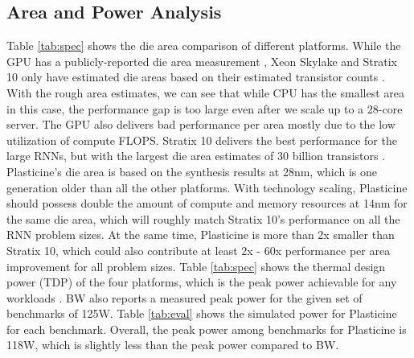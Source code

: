 \subsection{Area and Power Analysis} \label{sec:results}
Table \ref{tab:spec} shows the die area comparison of different platforms.
	While the GPU has a publicly-reported die area measurement \cite{markidis2018nvidia},
	Xeon Skylake and Stratix 10 only have estimated die areas based on
	their estimated transistor counts \cite{inteldie}.
With the rough area estimates, we can see that while CPU has the smallest area in this case,
	the performance gap is too large even after we scale up to a 28-core server.
The GPU also delivers bad performance per area mostly due to the low utilization of compute FLOPS.
Stratix 10 delivers the best performance for the large RNNs,
	but with the largest die area estimates of 30 billion transistors \cite{stratix10die}.
Plasticine's die area is based on the synthesis results at 28nm,
	which is one generation older than all the other platforms.
With technology scaling,
	Plasticine should possess double the amount of compute and memory resources at 14nm for the same die area,
	which will roughly match Stratix 10's performance on all the RNN problem sizes.
At the same time, Plasticine is more than 2x smaller than Stratix 10,
	which could also contribute at least 2x - 60x performance per area improvement for all problem sizes.
Table \ref{tab:spec} shows the thermal design power (TDP) of the four platforms,
	which is the peak power achievable for any workloads \cite{inteltdp, stratix10tdp, v100spec}.
BW also reports a measured peak power for the given set of benchmarks of 125W.
Table \ref{tab:eval} shows the simulated power for Plasticine for each benchmark.
	Overall, the peak power among benchmarks for Plasticine is 118W,
	which is slightly less than the peak power compared to BW.
